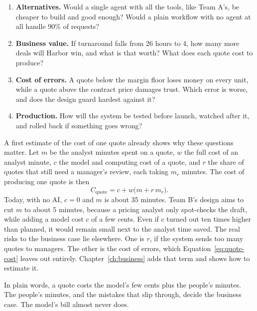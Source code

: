 \begin{thinkabout}
\begin{enumerate}[leftmargin=*,itemsep=2pt]
  \item \textbf{Alternatives.} Would a single agent with all the tools, like Team A's, be cheaper to build and good enough? Would a plain workflow with no agent at all handle 90\% of requests?
  \item \textbf{Business value.} If turnaround falls from 26 hours to 4, how many more deals will Harbor win, and what is that worth? What does each quote cost to produce?
  \item \textbf{Cost of errors.} A quote below the margin floor loses money on every unit, while a quote above the contract price damages trust. Which error is worse, and does the design guard hardest against it?
  \item \textbf{Production.} How will the system be tested before launch, watched after it, and rolled back if something goes wrong?
\end{enumerate}
\end{thinkabout}

A first estimate of the cost of one quote already shows why these questions matter. Let $m$ be the analyst minutes spent on a quote, $w$ the full cost of an analyst minute, $c$ the model and computing cost of a quote, and $r$ the share of quotes that still need a manager's review, each taking $m_r$ minutes. The cost of producing one quote is then
\begin{equation}
  C_{\text{quote}} = c + w \bigl( m + r\, m_r \bigr).
  \label{eq:quote-cost}
\end{equation}
Today, with no AI, $c = 0$ and $m$ is about 35 minutes. Team B's design aims to cut $m$ to about 5 minutes, because a pricing analyst only spot-checks the draft, while adding a model cost $c$ of a few cents. Even if $c$ turned out ten times higher than planned, it would remain small next to the analyst time saved. The real risks to the business case lie elsewhere. One is $r$, if the system sends too many quotes to managers. The other is the cost of errors, which Equation~\eqref{eq:quote-cost} leaves out entirely. Chapter~\ref{ch:business} adds that term and shows how to estimate it.

\begin{keyidea}
In plain words, a quote costs the model's few cents plus the people's minutes. The people's minutes, and the mistakes that slip through, decide the business case. The model's bill almost never does.
\end{keyidea}
